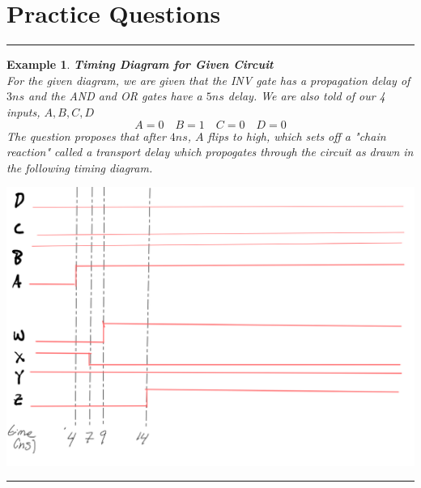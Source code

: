 \documentclass[12pt]{article}
\newtheorem{example}{Example}
\newenvironment{examp}
{\vspace{0.5cm}
 \hrule
\vspace{0.5cm}
\begin{example}}
{\hrule
\vspace{0.5cm}
\end{example}}
\begin{document}
\section*{Practice Questions} \begin{examp} \textbf{Timing Diagram for Given
		Circuit}\\ For the given diagram, we are given that the INV gate has a
	propagation delay of \(3 ns\) and the AND and OR gates have a \(5 ns\) delay.
	We are also told of our 4 inputs, \(A, B, C, D\) \[ A = 0 \quad B = 1 \quad C
		= 0 \quad D = 0 \] The question proposes that after \(4 ns\), \(A\) flips to
	high, which sets off a "chain reaction" called a transport delay which
	propogates through the circuit as drawn in the following timing diagram.
	\centerline{\includegraphics[scale=0.45]{examp072}} \end{examp}
\end{document}
